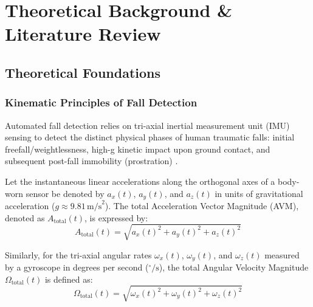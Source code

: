 \chapter{Theoretical Background \& Literature Review}
\label{chap:background}

\section{Theoretical Foundations}

\subsection{Kinematic Principles of Fall Detection}
Automated fall detection relies on tri-axial inertial measurement unit (IMU) sensing to detect the distinct physical phases of human traumatic falls: initial freefall/weightlessness, high-g kinetic impact upon ground contact, and subsequent post-fall immobility (prostration) \cite{fall_detection_mems}. 

Let the instantaneous linear accelerations along the orthogonal axes of a body-worn sensor be denoted by $a_x(t)$, $a_y(t)$, and $a_z(t)$ in units of gravitational acceleration ($g \approx 9.81\,\text{m/s}^2$). The total Acceleration Vector Magnitude (AVM), denoted as $A_{\text{total}}(t)$, is expressed by:
\begin{equation}
\label{eq:avm}
A_{\text{total}}(t) = \sqrt{a_x(t)^2 + a_y(t)^2 + a_z(t)^2}
\end{equation}

Similarly, for the tri-axial angular rates $\omega_x(t)$, $\omega_y(t)$, and $\omega_z(t)$ measured by a gyroscope in degrees per second ($^\circ/\text{s}$), the total Angular Velocity Magnitude $\Omega_{\text{total}}(t)$ is defined as:
\begin{equation}
\label{eq:gyro_magnitude}
\Omega_{\text{total}}(t) = \sqrt{\omega_x(t)^2 + \omega_y(t)^2 + \omega_z(t)^2}
\end{equation}

